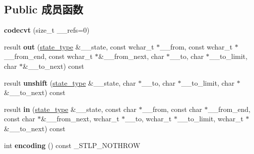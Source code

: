 \subsection*{Public 成员函数}
\begin{DoxyCompactItemize}
\item 
\mbox{\label{classcodecvt_3_01wchar__t_00_01char_00_01mbstate__t_01_4_ac3fc72f2d5f4795ddbc060e555a53c39}} 
{\bfseries codecvt} (size\+\_\+t \+\_\+\+\_\+refs=0)
\item 
\mbox{\label{classcodecvt_3_01wchar__t_00_01char_00_01mbstate__t_01_4_a19f8787ce077d7c378d0e1295ea50770}} 
result {\bfseries out} (\hyperlink{struct____mbstate__t}{state\+\_\+type} \&\+\_\+\+\_\+state, const wchar\+\_\+t $\ast$\+\_\+\+\_\+from, const wchar\+\_\+t $\ast$\+\_\+\+\_\+from\+\_\+end, const wchar\+\_\+t $\ast$\&\+\_\+\+\_\+from\+\_\+next, char $\ast$\+\_\+\+\_\+to, char $\ast$\+\_\+\+\_\+to\+\_\+limit, char $\ast$\&\+\_\+\+\_\+to\+\_\+next) const
\item 
\mbox{\label{classcodecvt_3_01wchar__t_00_01char_00_01mbstate__t_01_4_a4834b37e3d6d3c0aa08b227fa28f6089}} 
result {\bfseries unshift} (\hyperlink{struct____mbstate__t}{state\+\_\+type} \&\+\_\+\+\_\+state, char $\ast$\+\_\+\+\_\+to, char $\ast$\+\_\+\+\_\+to\+\_\+limit, char $\ast$\&\+\_\+\+\_\+to\+\_\+next) const
\item 
\mbox{\label{classcodecvt_3_01wchar__t_00_01char_00_01mbstate__t_01_4_a99cc671d51baf79234f5a572c04ff759}} 
result {\bfseries in} (\hyperlink{struct____mbstate__t}{state\+\_\+type} \&\+\_\+\+\_\+state, const char $\ast$\+\_\+\+\_\+from, const char $\ast$\+\_\+\+\_\+from\+\_\+end, const char $\ast$\&\+\_\+\+\_\+from\+\_\+next, wchar\+\_\+t $\ast$\+\_\+\+\_\+to, wchar\+\_\+t $\ast$\+\_\+\+\_\+to\+\_\+limit, wchar\+\_\+t $\ast$\&\+\_\+\+\_\+to\+\_\+next) const
\item 
\mbox{\label{classcodecvt_3_01wchar__t_00_01char_00_01mbstate__t_01_4_a27617c32225d80f9a1d3736787390114}} 
int {\bfseries encoding} () const \+\_\+\+S\+T\+L\+P\+\_\+\+N\+O\+T\+H\+R\+OW
\item 

\end{DoxyCompactItemize}
